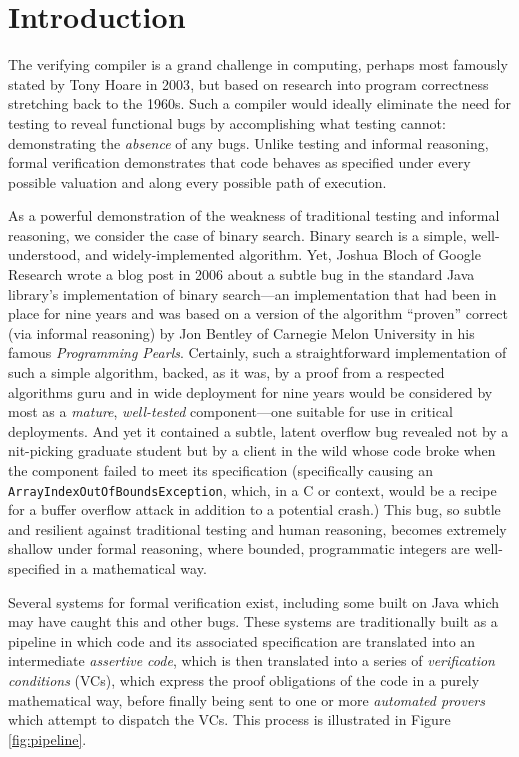 \section{Introduction}\label{sect:introduction}
The verifying compiler is a grand challenge in computing, perhaps most famously stated by Tony Hoare in 2003\cite{hoareGrandChallenge}, but based on research into program correctness stretching back to the 1960s\cite{hoareAxiomaticProgramming}.  Such a compiler would ideally eliminate the need for testing to reveal functional bugs by accomplishing what testing cannot: demonstrating the \emph{absence} of any bugs.  Unlike testing and informal reasoning, formal verification demonstrates that code behaves as specified under every possible valuation and along every possible path of execution.

As a powerful demonstration of the weakness of traditional testing and informal reasoning, we consider the case of binary search.  Binary search is a simple, well-understood, and widely-implemented algorithm.  Yet, Joshua Bloch of Google Research wrote a blog post\cite{blochBinarySearch} in 2006 about a subtle bug in the standard Java library's implementation of binary search---an implementation that had been in place for nine years and was based on a version of the algorithm ``proven'' correct (via informal reasoning) by Jon Bentley of Carnegie Melon University in his famous \emph{Programming Pearls}\cite{bentleyProgrammingPearls}.  Certainly, such a straightforward implementation of such a simple algorithm, backed, as it was, by a proof from a respected algorithms guru and in wide deployment for nine years would be considered by most as a \emph{mature}, \emph{well-tested} component---one suitable for use in critical deployments.  And yet it contained a subtle, latent overflow bug revealed not by a nit-picking graduate student but by a client in the wild whose code broke when the component failed to meet its specification (specifically causing an \texttt{ArrayIndexOutOfBoundsException}, which, in a C or \cplusplus context, would be a recipe for a buffer overflow attack in addition to a potential crash.)  This bug, so subtle and resilient against traditional testing and human reasoning, becomes extremely shallow under formal reasoning, where bounded, programmatic integers are well-specified in a mathematical way.

Several systems for formal verification exist, including some built on Java which may have caught this and other bugs.  These systems are traditionally built as a pipeline in which code and its associated specification are translated into an intermediate \emph{assertive code}, which is then translated into a series of \emph{verification conditions} (VCs), which express the proof obligations of the code in a purely mathematical way, before finally being sent to one or more \emph{automated provers} which attempt to dispatch the VCs.  This process is illustrated in Figure \ref{fig:pipeline}.

